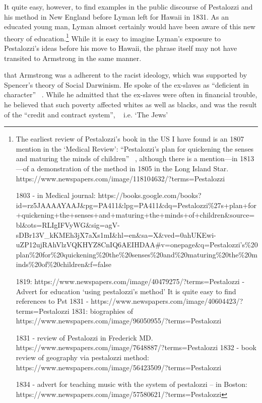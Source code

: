 It quite easy, however, to find examples in the public discourse of Pestalozzi and his method in New England before Lyman left for Hawaii in 1831. As an educated young man, Lyman almost certainly would have been aware of this new theory of education.\footnote{The earliest review of Pestalozzi's book in the US I have found is an 1807 mention in the `Medical Review': ``Pestalozzi's plan for quickening the senses and maturing the minds of children'' ~\citep{Mitchell:1807tp}, although there is a mention---in 1813---of a demonstration of the method in 1805 in the Long Island Star. https:\slash \slash www.newspapers.com\slash image\slash 118104632\slash ?terms=Pestalozzi

1803 - in Medical journal: https:\slash \slash books.google.com\slash books?id=rz5JAAAAYAAJ\&pg=PA411\&lpg=PA411\&dq=Pestalozzi\%27s+plan+for+quickening+the+senses+and+maturing+the+minds+of+children\&source=bl\&ots=RLIgIFVyWG\&sig=agV-sDBr13V\_kKMEh3jX7aXs1mI\&hl=en\&sa=X\&ved=0ahUKEwi-uZP12ujRAhVlzVQKHYZ8CnIQ6AEIHDAA\#v=onepage\&q=Pestalozzi's\%20plan\%20for\%20quickening\%20the\%20senses\%20and\%20maturing\%20the\%20minds\%20of\%20children\&f=false

1819: https:\slash \slash www.newspapers.com\slash image\slash 40479275\slash ?terms=Pestalozzi - Advert for education `using pestalozzi's method'
It is quite easy to find references to Pst
1831 - https:\slash \slash www.newspapers.com\slash image\slash 40604423\slash ?terms=Pestalozzi
1831: biographies of https:\slash \slash www.newspapers.com\slash image\slash 96050955\slash ?terms=Pestalozzi

1831 - review of Pestalozzi in Frederick MD. https:\slash \slash www.newspapers.com\slash image\slash 7648887\slash ?terms=Pestalozzi
1832 - book review of geography via pestalozzi method: https:\slash \slash www.newspapers.com\slash image\slash 56423509\slash ?terms=Pestalozzi

1834 - advert for teaching music with the system of pestalozzi -- in Boston: https:\slash \slash www.newspapers.com\slash image\slash 57580621\slash ?terms=Pestalozzi} While it is easy to imagine Lyman's exposure to Pestalozzi's ideas before his move to Hawaii, the phrase itself may not have transited to Armstrong in the same manner. 

 that Armstrong was a adherent to the racist ideology, which was supported by Spencer's theory of Social Darwinism. He spoke of the ex-slaves as ``deficient in character'' ~\citep[p. 6]{Armstrong:1891wr}. While he admitted that the ex-slaves were often in financial trouble, he believed that such poverty affected whites as well as blacks, and was the result of the ``credit and contract system'', ~\citep[p. 263]{Armstrong:2016ww} i.e. `The Jews' ~\citep[p. 24]{Spivey:1978un}

